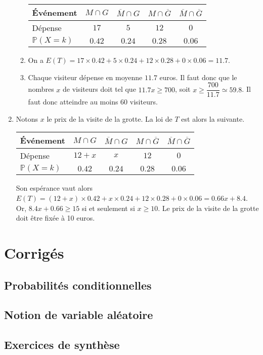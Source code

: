 \documentclass[11pt,fleqn, openany]{book} %
\begin{document}
\begin{solution}
\begin{enumerate}
\begin{enumerate}
\begin{center}
\begin{tabular}{|l|c|c|c|c|}
\hline
Événement & $M \cap G$ & $\overline{M}\cap G$ & $M \cap \overline{G}$ &$\overline{M} \cap \overline{G}$ \\
\hline
Dépense & $17$ & $5$ & $12$ & $0$ \\
\hline
$\mathbb{P}(X=k)$ & $0.42$  & $0.24$&$0.28$ & $0.06$\\
\hline \end{tabular}
\end{center}

\item On a $E(T)=17 \times 0.42 + 5 \times 0.24 + 12 \times 0.28 + 0 \times 0.06 = 11.7$.
\item Chaque visiteur dépense en moyenne $11.7$ euros. Il faut donc que le nombres $x$ de visiteurs doit tel que $11.7x \geqslant 700$, soit $x \geqslant \dfrac{700}{11.7}\simeq 59.8$. Il faut donc atteindre au moins 60 visiteurs.\end{enumerate}
\item Notons $x$ le prix de la visite de la grotte. La loi de $T$ est alors la suivante.

\begin{center}
\begin{tabular}{|l|c|c|c|c|}
\hline
Événement & $M \cap G$ & $\overline{M}\cap G$ & $M \cap \overline{G}$ &$\overline{M} \cap \overline{G}$ \\
\hline
Dépense& $12+x$ & $x$ & $12$ & $0$ \\
\hline
$\mathbb{P}(X=k)$ & $0.42$  & $0.24$&$0.28$ & $0.06$\\
\hline \end{tabular}
\end{center}

Son espérance vaut alors $E(T)=(12+x) \times 0.42 + x \times 0.24 + 12 \times 0.28 + 0 \times 0.06 = 0.66x+8.4$. Or, $8.4x+0.66\geqslant 15$ si et seulement si $x\geqslant 10$. Le prix de la visite de la grotte doit être fixée à 10 euros.\end{enumerate}\end{solution}




\chapter*{Corrigés}

\section*{Probabilités conditionnelles}

\printsolutions[collection={prob01}, headings={false} ]

\section*{Notion de variable aléatoire}


\printsolutions[collection={prob02}, headings={false} ]

\section*{Exercices de synthèse}


\printsolutions[collection={prob03}, headings={false} ]
\end{document}
